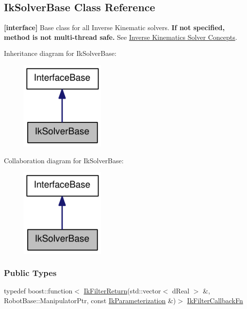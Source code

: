 \hypertarget{classOpenRAVE_1_1IkSolverBase}{
\subsection{IkSolverBase Class Reference}
\label{classOpenRAVE_1_1IkSolverBase}
}


{\bfseries \mbox{[}interface\mbox{]}} Base class for all Inverse Kinematic solvers. {\bfseries If not specified, method is not multi-\/thread safe.} See \hyperlink{arch__iksolver}{Inverse Kinematics Solver Concepts}.  




Inheritance diagram for IkSolverBase:\nopagebreak
\begin{figure}[H]
\begin{center}
\leavevmode
\includegraphics[width=120pt]{classOpenRAVE_1_1IkSolverBase__inherit__graph}
\end{center}
\end{figure}


Collaboration diagram for IkSolverBase:\nopagebreak
\begin{figure}[H]
\begin{center}
\leavevmode
\includegraphics[width=120pt]{classOpenRAVE_1_1IkSolverBase__coll__graph}
\end{center}
\end{figure}
\subsubsection*{Public Types}
\begin{DoxyCompactItemize}
\item 
typedef boost::function$<$ \hyperlink{namespaceOpenRAVE_a7a8cf38163621e225d83b4b3a8ff62e9}{IkFilterReturn}(std::vector$<$ dReal $>$ \&, RobotBase::ManipulatorPtr, const \hyperlink{classOpenRAVE_1_1IkParameterization}{IkParameterization} \&)$>$ \hyperlink{classOpenRAVE_1_1IkSolverBase_a2f7085e3e716d58bbbc95fa53926313e}{IkFilterCallbackFn}
\end{DoxyCompactItemize}

